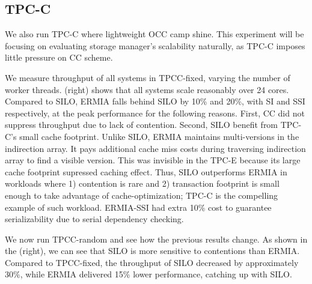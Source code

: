\subsection{TPC-C} 
We also run TPC-C where lightweight OCC camp shine. This experiment will be focusing on evaluating storage manager's scalability naturally, as TPC-C imposes little pressure on CC scheme. 

We measure throughput of all systems in TPCC-fixed, varying the number of worker threads. (right) shows that all systems scale reasonably over 24 cores. Compared to SILO, ERMIA falls behind SILO by 10\% and 20\%, with SI and SSI respectively, at the peak performance for the following reasons. First, CC did not suppress throughput due to lack of contention. Second, SILO benefit from TPC-C's small cache footprint. Unlike SILO, ERMIA maintains multi-versions in the indirection array. It pays additional cache miss costs during traversing indirection array to find a visible version. This was invisible in the TPC-E because its large cache footprint supressed caching effect.  Thus, SILO outperforms ERMIA in workloads where 1) contention is rare and 2) transaction footprint is small enough to take advantage of cache-optimization; TPC-C is the compelling example of such workload. ERMIA-SSI had extra 10\% cost to guarantee serializability due to serial dependency checking.

We now run TPCC-random and see how the previous results change. As shown in the (right), we can see that SILO is more sensitive to contentions than ERMIA. Compared to TPCC-fixed, the throughput of SILO decreased by approximately 30\%, while ERMIA delivered 15\% lower performance, catching up with SILO.
%
